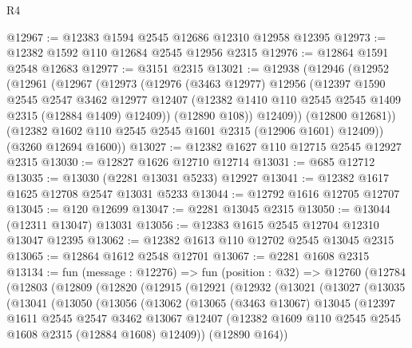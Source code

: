 \begin{lexlean}{R4}
\begin{coremodule}
@12967 := @12383 @1594 @2545 @12686 @12310 @12958 @12395
@12973 := @12382 @1592 @110 @12684 @2545 @12956 @2315
@12976 := @12864 @1591 @2548 @12683
@12977 := @3151 @2315
@13021 := @12938
    (@12946
      (@12952
        (@12961
          (@12967
            (@12973
              (@12976
                (@3463 @12977)
                @12956
                (@12397
                  @1590
                  @2545
                  @2547
                  @3462
                  @12977
                  @12407
                  (@12382 @1410 @110 @2545 @2545 @1409 @2315 (@12884 @1409) @12409))
                (@12890 @108))
              @12409))
          (@12800 @12681))
        (@12382 @1602 @110 @2545 @2545 @1601 @2315 (@12906 @1601) @12409))
      (@3260 @12694 @1600))
@13027 := @12382 @1627 @110 @12715 @2545 @12927 @2315
@13030 := @12827 @1626 @12710 @12714
@13031 := @685 @12712
@13035 := @13030 (@2281 @13031 @5233) @12927
@13041 := @12382 @1617 @1625 @12708 @2547 @13031 @5233
@13044 := @12792 @1616 @12705 @12707
@13045 := @120 @12699
@13047 := @2281 @13045 @2315
@13050 := @13044 (@12311 @13047) @13031
@13056 := @12383 @1615 @2545 @12704 @12310 @13047 @12395
@13062 := @12382 @1613 @110 @12702 @2545 @13045 @2315
@13065 := @12864 @1612 @2548 @12701
@13067 := @2281 @1608 @2315
@13134 := fun (message : @12276) =>
  fun (position : @32) =>
  @12760
    (@12784
      (@12803
        (@12809
          (@12820
            (@12915
              (@12921
                (@12932
                  (@13021
                    (@13027
                      (@13035
                        (@13041
                          (@13050
                            (@13056
                              (@13062
                                (@13065
                                  (@3463 @13067)
                                  @13045
                                  (@12397
                                    @1611
                                    @2545
                                    @2547
                                    @3462
                                    @13067
                                    @12407
                                    (@12382
                                      @1609
                                      @110
                                      @2545
                                      @2545
                                      @1608
                                      @2315
                                      (@12884 @1608)
                                      @12409))
                                  (@12890 @164))

\end{coremodule}
\end{lexlean}
